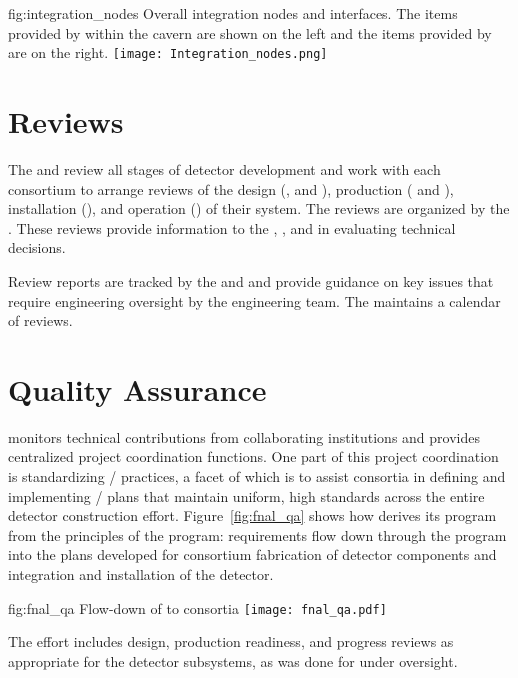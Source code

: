 \begin{dunefigure}{fig:integration_nodes}
  {Overall integration nodes and interfaces. The items
provided by  within the cavern are shown on the left and the items provided by
 are on the right.}
  \texttt{[image: Integration\_nodes.png]}
\end{dunefigure}




\section{Reviews}
\label{sec:es-tc-reviews}

The  and  review all stages of detector development
and work with each consortium to arrange reviews of the design
(,  and ), production (
and ), installation (), and operation
() of their system. The reviews are organized by the
 .  These
reviews provide information to the , , and 
in evaluating technical decisions. 

Review reports are tracked by the   and  and provide
guidance on key issues that require engineering oversight by the
 engineering team. The   maintains a
calendar of  reviews. 

\section{Quality Assurance}
\label{sec:es-tc-qa}

  monitors technical contributions from
collaborating institutions and provides centralized project
coordination functions. One part of this project coordination is
standardizing / practices, a facet
of which is to assist consortia in defining and implementing
/ plans that maintain uniform, high
standards across the entire detector construction
effort. Figure~\ref{fig:fnal_qa} shows how  
derives its  program from the principles of the \fnal {} program:
requirements %
flow down through the 
 program into the  plans developed for consortium fabrication of
detector components and integration and installation of the detector.
\begin{dunefigure}{fig:fnal_qa}
  {Flow-down of \fnal {} to consortia}
  \texttt{[image: fnal\_qa.pdf]}
\end{dunefigure}
The  effort includes design, production readiness, and
progress reviews as appropriate for the  detector
subsystems, as was done for  under 
oversight.

